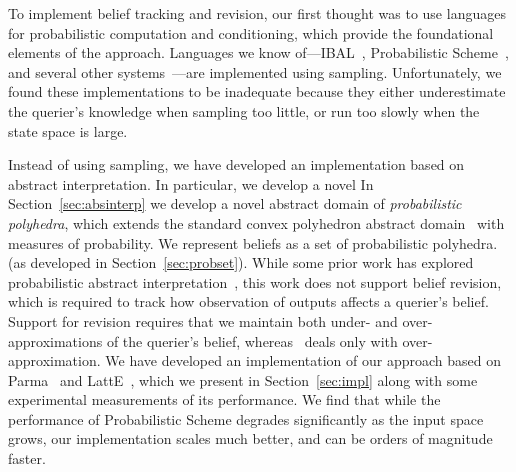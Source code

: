 To implement belief tracking and revision, our first thought was to use
languages for probabilistic computation and conditioning, which provide the
foundational elements of the approach.  Languages we know
of---IBAL~\cite{pfeffer07ibal}, Probabilistic
Scheme~\cite{radul07probscheme}, and several other
systems~\cite{park08sampling,goodman08church,kiselyov09embedded}---are
implemented using sampling.  Unfortunately, we found these implementations
to be inadequate because they either underestimate the querier's knowledge
when sampling too little, or run too slowly when the state space is large.

Instead of using sampling, we have developed an implementation based on
abstract interpretation.  
\ifacita
In particular, we develop a novel
\else
In Section~\ref{sec:absinterp} we develop a novel
\fi
abstract domain of \emph{probabilistic polyhedra}, which extends the
standard convex polyhedron abstract domain~\cite{CousotHalbwachs78-POPL} with
measures of probability.  We represent beliefs as a set of probabilistic
\ifacita
polyhedra.
\else
(as developed in Section~\ref{sec:probset}).
\fi
While some prior work has explored probabilistic abstract
interpretation~\cite{monniaux00prob}, this work does not support belief
revision, which is required to track how observation of outputs affects a
querier's belief.  Support for revision requires that we maintain both
under- and over-approximations of the querier's belief,
whereas~\cite{monniaux00prob} deals only with over-approximation.  We have
developed an implementation of our approach based on Parma~\cite{parma} and
LattE~\cite{latte}, which we present in Section~\ref{sec:impl} along with
some experimental measurements of its performance.  We find that while the
performance of Probabilistic Scheme degrades significantly as the input
space grows, our implementation scales much better, and can be orders of
magnitude faster.

